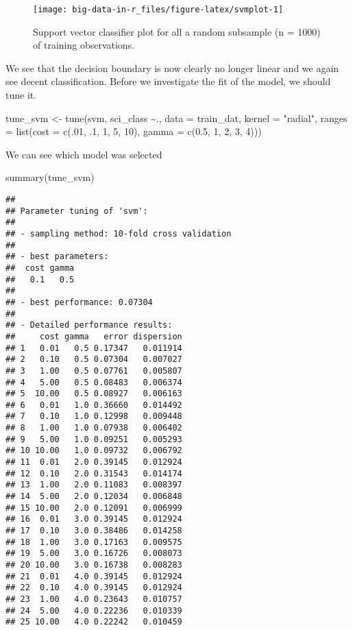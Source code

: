 \documentclass[
]{book}
\newenvironment{Shaded}{\begin{snugshade}}{\end{snugshade}}
\newcommand{\AttributeTok}[1]{\textcolor[rgb]{0.77,0.63,0.00}{#1}}
\newcommand{\DecValTok}[1]{\textcolor[rgb]{0.00,0.00,0.81}{#1}}
\newcommand{\FloatTok}[1]{\textcolor[rgb]{0.00,0.00,0.81}{#1}}
\newcommand{\FunctionTok}[1]{\textcolor[rgb]{0.00,0.00,0.00}{#1}}
\newcommand{\NormalTok}[1]{#1}
\newcommand{\OtherTok}[1]{\textcolor[rgb]{0.56,0.35,0.01}{#1}}
\newcommand{\SpecialCharTok}[1]{\textcolor[rgb]{0.00,0.00,0.00}{#1}}
\newcommand{\StringTok}[1]{\textcolor[rgb]{0.31,0.60,0.02}{#1}}
\begin{document}
\begin{figure}
\texttt{[image: big-data-in-r\_files/figure-latex/svmplot-1]} \caption{Support vector classifier plot for all a random subsample (n = 1000) of training observations.}\label{fig:svmplot}
\end{figure}

We see that the decision boundary is now clearly no longer linear and we again see decent classification. Before we investigate the fit of the model, we should tune it.

\begin{Shaded}
\begin{Highlighting}[]
\NormalTok{tune\_svm }\OtherTok{\textless{}{-}} \FunctionTok{tune}\NormalTok{(svm, sci\_class }\SpecialCharTok{\textasciitilde{}}\NormalTok{., }\AttributeTok{data =}\NormalTok{ train\_dat,}
                 \AttributeTok{kernel =} \StringTok{"radial"}\NormalTok{,}
                 \AttributeTok{ranges =} \FunctionTok{list}\NormalTok{(}\AttributeTok{cost =} \FunctionTok{c}\NormalTok{(.}\DecValTok{01}\NormalTok{, .}\DecValTok{1}\NormalTok{, }\DecValTok{1}\NormalTok{, }\DecValTok{5}\NormalTok{, }\DecValTok{10}\NormalTok{),}
                               \AttributeTok{gamma =} \FunctionTok{c}\NormalTok{(}\FloatTok{0.5}\NormalTok{, }\DecValTok{1}\NormalTok{, }\DecValTok{2}\NormalTok{, }\DecValTok{3}\NormalTok{, }\DecValTok{4}\NormalTok{)))}
\end{Highlighting}
\end{Shaded}

We can see which model was selected

\begin{Shaded}
\begin{Highlighting}[]
\FunctionTok{summary}\NormalTok{(tune\_svm)}
\end{Highlighting}
\end{Shaded}

\begin{verbatim}
## 
## Parameter tuning of 'svm':
## 
## - sampling method: 10-fold cross validation 
## 
## - best parameters:
##  cost gamma
##   0.1   0.5
## 
## - best performance: 0.07304 
## 
## - Detailed performance results:
##     cost gamma   error dispersion
## 1   0.01   0.5 0.17347   0.011914
## 2   0.10   0.5 0.07304   0.007027
## 3   1.00   0.5 0.07761   0.005807
## 4   5.00   0.5 0.08483   0.006374
## 5  10.00   0.5 0.08927   0.006163
## 6   0.01   1.0 0.36660   0.014492
## 7   0.10   1.0 0.12998   0.009448
## 8   1.00   1.0 0.07938   0.006402
## 9   5.00   1.0 0.09251   0.005293
## 10 10.00   1.0 0.09732   0.006792
## 11  0.01   2.0 0.39145   0.012924
## 12  0.10   2.0 0.31543   0.014174
## 13  1.00   2.0 0.11083   0.008397
## 14  5.00   2.0 0.12034   0.006848
## 15 10.00   2.0 0.12091   0.006999
## 16  0.01   3.0 0.39145   0.012924
## 17  0.10   3.0 0.38486   0.014258
## 18  1.00   3.0 0.17163   0.009575
## 19  5.00   3.0 0.16726   0.008073
## 20 10.00   3.0 0.16738   0.008283
## 21  0.01   4.0 0.39145   0.012924
## 22  0.10   4.0 0.39145   0.012924
## 23  1.00   4.0 0.23643   0.010757
## 24  5.00   4.0 0.22236   0.010339
## 25 10.00   4.0 0.22242   0.010459
\end{verbatim}
\end{document}
